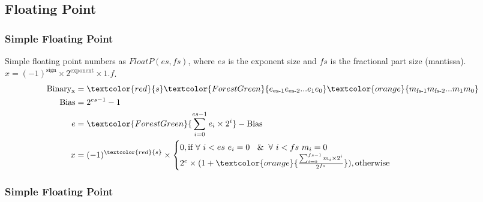 \subsection{Floating Point}
\begin{frame}
    \frametitle{Simple Floating Point}
    Simple floating point numbers as $FloatP(es, fs)$, where $es$ is the exponent size and $fs$ is the fractional part size (mantissa).
    $x=(-1)^{\text{sign}} \times 2^{\text{exponent}}  \times 1.f$.
    \begin{equation}
        \begin{aligned}
            \text{Binary}\textsubscript{x}&=\textcolor{red}{s}\textcolor{ForestGreen}{e\textsubscript{es-1}e\textsubscript{es-2}...e\textsubscript{1}e\textsubscript{0}}\textcolor{orange}{m\textsubscript{fs-1}m\textsubscript{fs-2}...m\textsubscript{1}m\textsubscript{0}}\\
            \text{Bias}&=2^{es-1}-1\\
            e&=\textcolor{ForestGreen}{\sum_{i=0}^{es-1} e_i \times 2^{i}} - \text{Bias}\\
            x&=(-1)^{\textcolor{red}{s}} \times \begin{cases}
                    0, \text{if } \forall\ i<es\ e_i=0\ \And \forall\ i<fs\ m_i=0 \\
                    2^e \times (1 + \textcolor{orange}{\frac{\sum_{i=0}^{fs-1} m_i \times 2^i}{2^{fs}}}), \text{otherwise}
            \end{cases}
        \end{aligned}
    \end{equation}
\end{frame}

\begin{frame}
    \frametitle{Simple Floating Point}
\end{frame}

